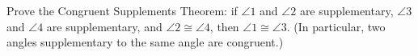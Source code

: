 Prove the Congruent Supplements Theorem: if $\angle1$ and $\angle2$ are supplementary, $\angle3$ and $\angle4$ are supplementary, and $\angle2\cong\angle4$, then $\angle1\cong\angle3$. (In particular, two angles supplementary to the same angle are congruent.)
